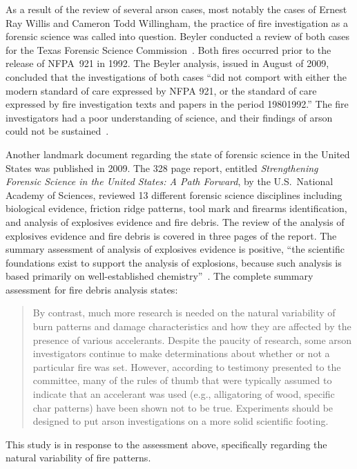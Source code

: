 \documentclass[twoside]{uocthesis}
\begin{document}
As a result of the review of several arson cases, most notably the cases of Ernest Ray Willis and Cameron Todd Willingham, the practice of fire investigation as a forensic science was called into question.  Beyler conducted a review of both cases for the Texas Forensic Science Commission~\cite{Beyler:2009}.  Both fires occurred prior to the release of NFPA~921 in 1992.  The Beyler analysis, issued in August of 2009, concluded that the investigations of both cases ``did not comport with either the modern standard of care expressed by NFPA 921, or the standard of care expressed by fire investigation texts and papers in the period 1980{\textendash}1992.'' The fire investigators had a poor understanding of science, and their findings of arson could not be sustained~\cite{Beyler:2009}.

Another landmark document regarding the state of forensic science in the United States was published in 2009.  The 328 page report, entitled {\em Strengthening Forensic Science in the United States: A Path Forward}, by the U.S.~National Academy of Sciences, reviewed 13 different forensic science disciplines including biological evidence, friction ridge patterns, tool mark and firearms identification, and analysis of explosives evidence and fire debris.  The review of the analysis of explosives evidence and fire debris is covered in three pages of the report.  The summary assessment of analysis of explosives evidence is positive, ``the scientific foundations exist to support the analysis of explosions, because such analysis is based primarily on well-established chemistry''~\cite{Forensic:2009}.  The complete summary assessment for fire debris analysis states: 

\begin{quotation}
By contrast, much more research is needed on the natural variability of burn patterns and damage characteristics and how they are affected by the presence of various accelerants.  Despite the paucity of research, some arson investigators continue to make determinations about whether or not a particular fire was set.  However, according to testimony presented to the committee, many of the rules of thumb that were typically assumed to indicate that an accelerant was used (e.g., alligatoring of wood, specific char patterns) have been shown not to be true.  Experiments should be designed to put arson investigations on a more solid scientific footing.
\end{quotation}

This study is in response to the assessment above, specifically regarding the natural variability of fire patterns.
\end{document}
